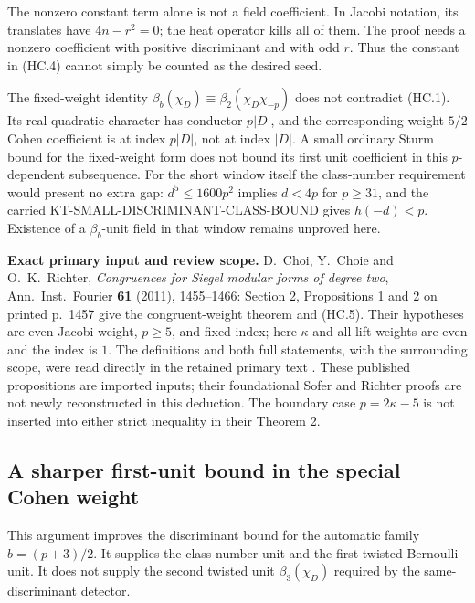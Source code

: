 \documentclass[11pt,a4paper]{article}
\theoremstyle{definition}
\renewcommand{\paragraph}[1]{\par\smallskip\noindent\textbf{#1}\quad\ignorespaces}
\begin{document}
The nonzero constant term alone is not a field coefficient.
In Jacobi notation, its translates have $4n-r^2=0$; the heat
operator kills all of them.  The proof needs a nonzero
coefficient with positive discriminant and with odd $r$.
Thus the constant in (HC.4) cannot simply be counted as the
desired seed.

The fixed-weight identity
$\beta_b(\chi_D)\equiv\beta_2(\chi_D\chi_{-p})$
does not contradict (HC.1).  Its real quadratic character has
conductor $p|D|$, and the corresponding weight-$5/2$ Cohen
coefficient is at index $p|D|$, not at index $|D|$.
A small ordinary Sturm bound for the fixed-weight form
does not bound its first unit coefficient in this
$p$-dependent subsequence.
For the short window itself the class-number requirement
would present no extra gap: $d^5\leq1600p^2$ implies
$d<4p$ for $p\geq31$, and the carried
KT-SMALL-DISCRIMINANT-CLASS-BOUND gives $h(-d)<p$.
Existence of a $\beta_b$-unit field in that window remains
unproved here.

\paragraph{Exact primary input and review scope.}
D.~Choi, Y.~Choie and O.~K.~Richter,
\emph{Congruences for Siegel modular forms of degree two},
Ann.~Inst.~Fourier \textbf{61} (2011), 1455--1466:
Section 2, Propositions 1 and 2 on printed p.~1457 give
the congruent-weight theorem and (HC.5).
Their hypotheses are even Jacobi weight, $p\geq5$, and
fixed index; here $\kappa$ and all lift weights are even
and the index is $1$.  The definitions and both full
statements, with the surrounding scope, were read directly
in the retained primary text
.
These published propositions are imported inputs; their
foundational Sofer and Richter proofs are not newly
reconstructed in this deduction.  The boundary case
$p=2\kappa-5$ is not inserted into either strict inequality
in their Theorem 2.



\subsection{A sharper first-unit bound in the special Cohen weight}

This argument improves the discriminant bound for the automatic family
$b=(p+3)/2$.  It supplies the class-number unit and the first twisted
Bernoulli unit.  It does not supply the second twisted unit
$\beta_3(\chi_D)$ required by the same-discriminant detector.
\end{document}
